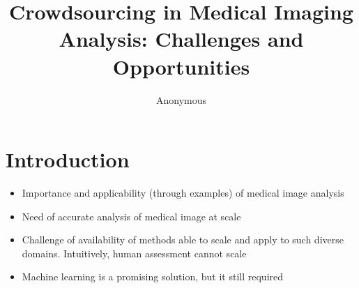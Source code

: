 \documentclass[10pt,twocolumn,letterpaper]{article}
\begin{document}
\title{Crowdsourcing in Medical Imaging Analysis: Challenges and Opportunities}
\author{Anonymous}

\maketitle
\ifwacvfinal\thispagestyle{empty}\fi

\begin{abstract}

\end{abstract}

\section{Introduction} 
\begin{itemize}
    \item Importance and applicability (through examples) of medical image analysis
    \item Need of accurate analysis of medical image at scale
    \item Challenge of availability of methods able to scale and apply to such diverse domains. Intuitively, human assessment cannot scale
    \item Machine learning is a promising solution, but it still required
    
\end{itemize}


\end{document}
